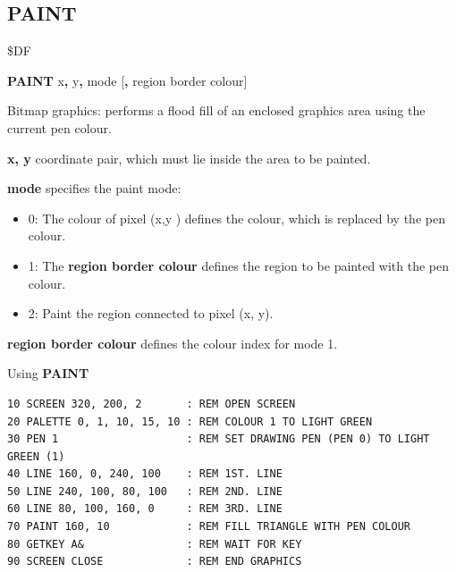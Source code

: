 
\newpage
\subsection{PAINT}
\begin{description}[leftmargin=2cm,style=nextline]
\item [Token:]    \$DF

\item [Format:]   {\bf PAINT} x{\bf,} y{\bf,} mode [{\bf,} region border colour]

\item [Usage:]    Bitmap graphics: performs a flood fill of an enclosed graphics area using the current pen colour.

                  {\bf x, y} coordinate pair, which must lie inside the area to be painted.

                  {\bf mode} specifies the paint mode:
                  \begin{itemize}
                     \item 0: The colour of pixel (x,y ) defines the colour, which is replaced by the pen colour.
                     \item 1: The {\bf region border colour} defines the region to be painted with the pen colour.
                     \item 2: Paint the region connected to pixel (x, y).
                  \end{itemize}

                  {\bf region border colour} defines the colour index for mode 1.

\item [Example:]  Using {\bf PAINT}

\begin{tcolorbox}[colback=black,coltext=white]
\verbatimfont{\codefont}
\begin{verbatim}
10 SCREEN 320, 200, 2       : REM OPEN SCREEN
20 PALETTE 0, 1, 10, 15, 10 : REM COLOUR 1 TO LIGHT GREEN
30 PEN 1                    : REM SET DRAWING PEN (PEN 0) TO LIGHT GREEN (1)
40 LINE 160, 0, 240, 100    : REM 1ST. LINE
50 LINE 240, 100, 80, 100   : REM 2ND. LINE
60 LINE 80, 100, 160, 0     : REM 3RD. LINE
70 PAINT 160, 10            : REM FILL TRIANGLE WITH PEN COLOUR
80 GETKEY A&                : REM WAIT FOR KEY
90 SCREEN CLOSE             : REM END GRAPHICS
\end{verbatim}
\end{tcolorbox}
\end{description}

